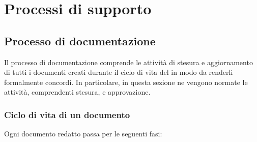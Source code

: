 \section{Processi di supporto}
\subsection{Processo di documentazione}
Il processo di documentazione comprende le attività di stesura e aggiornamento di tutti i documenti creati durante il ciclo di vita del  in modo da renderli formalmente concordi. In particolare, in questa sezione ne vengono normate le attività, comprendenti stesura,  e approvazione. 
\subsubsection{Ciclo di vita di un documento}
Ogni documento redatto passa per le seguenti fasi:

